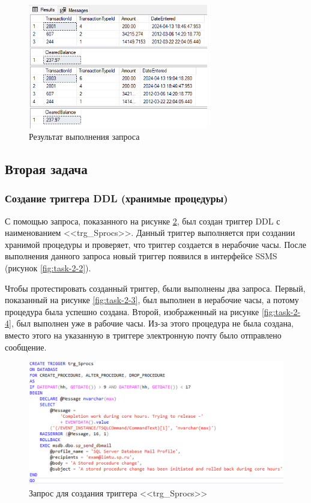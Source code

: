 \documentclass[a4paper, 14pt]{extarticle}
\begin{document}
\begin{figure}[H]
  \centering
  \includegraphics[width=0.7\textwidth]{images/task-1/10.png}
  \caption{Результат выполнения запроса}
  \label{fig:task-1-10}
\end{figure}

\subsection{Вторая задача}

\subsubsection{Создание триггера DDL (хранимые процедуры)}

С помощью запроса, показанного на рисунке \ref{fig:task-2-1}, был создан триггер
DDL с наименованием <<\foreignlanguage{english}{trg\_Sprocs}>>. Данный триггер
выполняется при создании хранимой процедуры и проверяет, что триггер создается в
нерабочие часы. После выполнения данного запроса новый триггер появился в
интерфейсе SSMS (рисунок \ref{fig:task-2-2}).

Чтобы протестировать созданный триггер, были выполнены два запроса. Первый,
показанный на рисунке \ref{fig:task-2-3}, был выполнен в нерабочие часы, а
потому процедура была успешно создана. Второй, изображенный на рисунке
\ref{fig:task-2-4}, был выполнен уже в рабочие часы. Из-за этого процедура не
была создана, вместо этого на указанную в триггере электронную почту было
отправлено сообщение.

\begin{figure}[H]
  \centering
  \includegraphics[width=\textwidth]{images/task-2/1.png}
  \caption{
    Запрос для создания триггера <<\foreignlanguage{english}{trg\_Sprocs}>>
  }
  \label{fig:task-2-1}
\end{figure}
\end{document}
